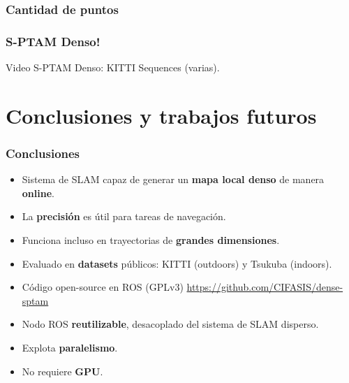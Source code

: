 \documentclass[compress]{beamer}
\begin{document}
\begin{frame}
	\frametitle{Cantidad de puntos}
	\begin{figure}[!htb]
		\centering
		\hfil
	\end{figure}
\end{frame}


\begin{frame}
	\frametitle{S-PTAM Denso!}
	Video S-PTAM Denso: KITTI Sequences (varias).
\end{frame}


\section{Conclusiones y trabajos futuros}


\begin{frame}
	\frametitle{Conclusiones}
	\begin{itemize}
		\item Sistema de SLAM capaz de generar un \textbf{mapa local denso} de manera \textbf{online}.
        \item La \textbf{precisión} es útil para tareas de navegación.
        \item Funciona incluso en trayectorias de \textbf{grandes dimensiones}.
        \item Evaluado en \textbf{datasets} públicos: KITTI (outdoors) y Tsukuba (indoors).
	    \item Código open-source en ROS (GPLv3) \url{https://github.com/CIFASIS/dense-sptam}
	    \item Nodo ROS \textbf{reutilizable}, desacoplado del sistema de SLAM disperso.
	  	\item Explota \textbf{paralelismo}.
	  	\item No requiere \textbf{GPU}.
	\end{itemize}
\end{frame}
\end{document}
